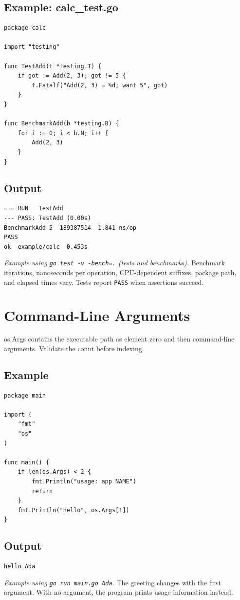 \documentclass[10pt,oneside]{article}
\newcommand{\sectionline}{\par\vspace{4pt}{\color{rule}\hrule height .5pt}\vspace{7pt}\color{ink}\noindent}
\begin{document}
\subsection*{Example: calc\_test.go}
\begin{lstlisting}[style=gocode]
package calc

import "testing"

func TestAdd(t *testing.T) {
    if got := Add(2, 3); got != 5 {
        t.Fatalf("Add(2, 3) = %d; want 5", got)
    }
}

func BenchmarkAdd(b *testing.B) {
    for i := 0; i < b.N; i++ {
        Add(2, 3)
    }
}
\end{lstlisting}


\subsection*{Output}
\begin{lstlisting}[style=terminal]
=== RUN   TestAdd
--- PASS: TestAdd (0.00s)
BenchmarkAdd-5  189387514  1.841 ns/op
PASS
ok  example/calc  0.453s
\end{lstlisting}
\emph{Example using \texttt{go test -v -bench=.} (tests and benchmarks).} Benchmark iterations, nanoseconds per operation, CPU-dependent suffixes, package path, and elapsed times vary. Tests report \texttt{PASS} when assertions succeed.
\clearpage
\section{Command-Line Arguments}
\sectionline
os.Args contains the executable path as element zero and then command-line arguments. Validate the count before indexing.\par
\subsection*{Example}
\begin{lstlisting}[style=gocode]
package main

import (
	"fmt"
	"os"
)

func main() {
	if len(os.Args) < 2 {
		fmt.Println("usage: app NAME")
		return
	}
	fmt.Println("hello", os.Args[1])
}
\end{lstlisting}


\subsection*{Output}
\begin{lstlisting}[style=terminal]
hello Ada
\end{lstlisting}
\emph{Example using \texttt{go run main.go Ada}.} The greeting changes with the first argument. With no argument, the program prints usage information instead.
\clearpage
\end{document}
